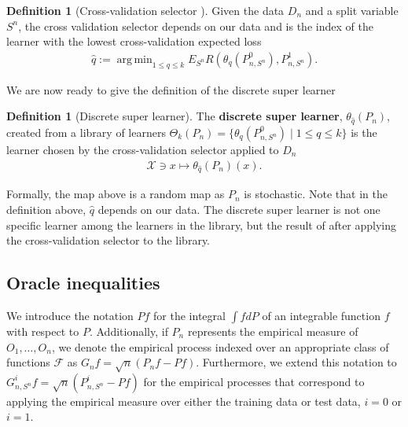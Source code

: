 \documentclass[11pt, a4paper]{article}
\DeclareMathOperator*{\argmin}{arg\,min}
\theoremstyle{definition}
\newtheorem{definition}[theorem]{Definition}
\theoremstyle{remark}
\newcommand{\q}{q}
\newcommand{\ml}{k}
\newcommand{\btheta}{\theta}
\newcommand{\Sn}{S^n}
\newcommand{\lib}{\Theta}
\begin{document}
\begin{definition}[Cross-validation selector \parencite{laan03}]
    Given the data $ D_n $ and a split variable $ \Sn $, the cross validation selector depends on our data and is the index of the learner with the lowest cross-validation expected loss 
    \begin{align*}
        \hat{\q} := \argmin_{1 \leq \q \leq k}  E_{\Sn} R( \btheta_\q(P_{n,\Sn}^{0}), P_{n, \Sn}^{1}).
    \end{align*}
\end{definition}
%
We are now ready to give the definition of the discrete super learner
\begin{definition}[Discrete super learner]
    The \textbf{discrete super learner}, $ \btheta_{ \hat{\q} }(P_n) $, created from a library of learners $ \lib_{k}(P_n) = \{ \btheta_{\q}(P_{n, \Sn}^{0}) \mid 1 \leq \q \leq \ml \}$ is the learner chosen by the cross-validation selector applied to $ D_n $  
    \begin{align*}
        \mathcal{X} \ni x \mapsto \theta_{\hat{\q}}(P_n)(x). 
    \end{align*}
\end{definition}
Formally, the map above is a random map as $ P_n $ is stochastic. Note that in the definition above, $ \hat{q}  $ depends on our data. The discrete super learner is not one specific learner among the learners in the library, but the result of after applying the cross-validation selector to the library. 

\subsection{Oracle inequalities}
We introduce the notation $Pf$ for the integral $\int f dP$ of an integrable function $f$ with respect to $P$. Additionally, if $P_n$ represents the empirical measure of $O_1, \dots, O_n$, we denote the empirical process indexed over an appropriate class of functions $\mathcal{F}$ as $G_n f = \sqrt{n}(P_n f - P f)$. Furthermore, we extend this notation to $G_{n, \Sn}^{i} f = \sqrt{n}(P_{n, \Sn}^{i} - Pf)$ for the empirical processes that correspond to applying the empirical measure over either the training data or test data, $ i = 0 $ or $ i = 1 $.
\end{document}
